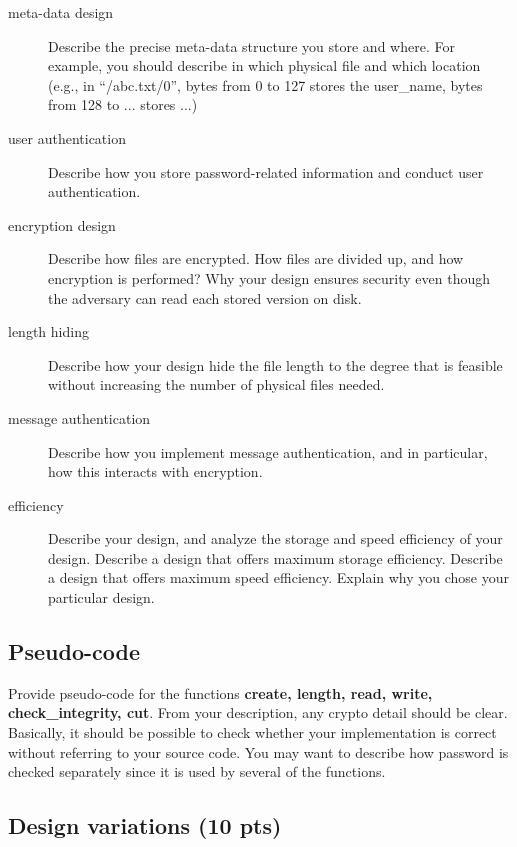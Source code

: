 \documentclass[11pt]{article}
\begin{document}
\begin{description}
 \item[meta-data design]
Describe the precise meta-data structure you store and where.  For example, you should describe in which physical file and which location (e.g., in ``/abc.txt/0'', bytes from 0 to 127 stores the user\_name, bytes from 128 to ... stores ...)

 \item[user authentication]
Describe how you store password-related information and conduct user authentication.

 \item[encryption design]
Describe how files are encrypted.  How files are divided up, and how encryption is performed?  Why your design ensures security  even though the adversary can read each stored version on disk.

 \item[length hiding]
Describe how your design hide the file length to the degree that is feasible without increasing the number of physical files needed.

 \item[message authentication]
Describe how you implement message authentication, and in particular, how this interacts with encryption.

 \item[efficiency]
Describe your design, and analyze the storage and speed efficiency of your design.  Describe a design that offers maximum storage efficiency.  Describe a design that offers maximum speed efficiency.  Explain why you chose your particular design.
\end{description}

\subsection{Pseudo-code}

Provide pseudo-code for the functions \textbf{create, length, read, write, check\_integrity, cut}.  From your description, any crypto detail should be clear.  Basically, it should be possible to check whether your implementation is correct without referring to your source code.  You may want to describe how password is checked separately since it is used by several of the functions.


\subsection{Design variations (10 pts)}\label{sec:que}
\end{document}
